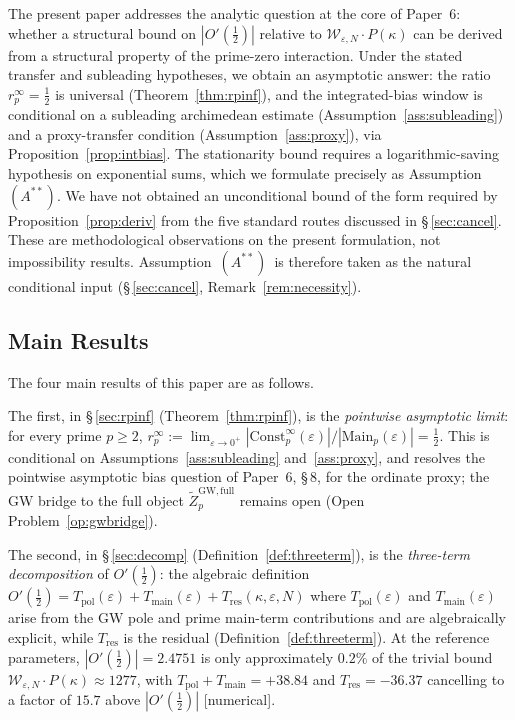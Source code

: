 \documentclass[11pt]{article}
\newcommand{\Wgamma}{\mathcal{W}_{\varepsilon,N}}   %
\newcommand{\Astar}{\ensuremath{(A^{**})}}  %
\begin{document}
The present paper addresses the analytic question at the core of
Paper~6: whether a structural bound on $|O'(\tfrac12)|$
relative to $\Wgamma\cdot P(\kappa)$ can be derived from a
structural property of the prime-zero interaction.
Under the stated transfer and subleading hypotheses, we obtain
an asymptotic answer: the ratio
$r_p^\infty=\tfrac12$ is universal (Theorem~\ref{thm:rpinf}), and
the integrated-bias window is conditional on a subleading
archimedean estimate (Assumption~\ref{ass:subleading})
and a proxy-transfer condition (Assumption~\ref{ass:proxy}),
via Proposition~\ref{prop:intbias}.
The stationarity bound requires a logarithmic-saving hypothesis on
exponential sums, which we formulate precisely as Assumption~\Astar.
We have not obtained an unconditional bound of the form required by
Proposition~\ref{prop:deriv} from the five standard routes discussed
in \S\,\ref{sec:cancel}.
These are methodological observations on the present formulation,
not impossibility results.
Assumption~\Astar\ is therefore taken as the natural conditional input
(\S\,\ref{sec:cancel}, Remark~\ref{rem:necessity}).

\subsection{Main Results}

The four main results of this paper are as follows.

The first, in \S\,\ref{sec:rpinf} (Theorem~\ref{thm:rpinf}), is the
\emph{pointwise asymptotic limit}: for every prime $p\ge 2$,
$r_p^\infty := \lim_{\varepsilon\to 0^+}
|\mathrm{Const}_p^\infty(\varepsilon)|/|\mathrm{Main}_p(\varepsilon)| = \tfrac12$.
This is conditional on Assumptions~\ref{ass:subleading} and~\ref{ass:proxy},
and resolves the pointwise asymptotic bias question
of Paper~6, \S\,8, for the ordinate proxy; the GW bridge
to the full object $\widetilde Z_p^{\mathrm{GW,full}}$ remains open
(Open Problem~\ref{op:gwbridge}).

The second, in \S\,\ref{sec:decomp} (Definition~\ref{def:threeterm}), is
the \emph{three-term decomposition} of $O'(\tfrac12)$: the algebraic
definition $O'(\tfrac12)=T_{\mathrm{pol}}(\varepsilon)+T_{\mathrm{main}}(\varepsilon)+T_{\mathrm{res}}(\kappa,\varepsilon,N)$
where $T_{\mathrm{pol}}(\varepsilon)$ and $T_{\mathrm{main}}(\varepsilon)$ arise from the GW pole and
prime main-term contributions and are algebraically explicit, while $T_{\mathrm{res}}$ is the
residual (Definition~\ref{def:threeterm}).
At the reference parameters, $|O'(\tfrac12)|=2.4751$ is only
approximately $0.2\%$ of the trivial bound $\Wgamma\cdot P(\kappa)\approx 1277$,
with $T_{\mathrm{pol}}+T_{\mathrm{main}}=+38.84$ and $T_{\mathrm{res}}=-36.37$ cancelling to a factor of $15.7$
above $|O'(\tfrac12)|$ [numerical].
\end{document}
